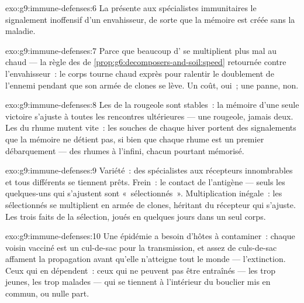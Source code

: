 \begin{solution}{exo:g9:immune-defenses:6}
La  présente aux spécialistes immunitaires le
signalement inoffensif d'un envahisseur, de sorte que la
mémoire est créée sans la maladie.
\end{solution}

\begin{solution}{exo:g9:immune-defenses:7}
Parce que beaucoup d' se multiplient plus
mal au chaud --- la règle des  de
\cref{prop:g6:decomposers-and-soil:speed} retournée contre
l'envahisseur~: le corps tourne chaud exprès pour ralentir
le doublement de l'ennemi pendant que son armée de clones se
lève. Un coût, oui~; une panne, non.
\end{solution}

\begin{solution}{exo:g9:immune-defenses:8}
Les  de la rougeole sont stables~: la mémoire d'une
seule victoire s'ajuste à toutes les rencontres
ultérieures --- une rougeole, jamais deux. Les  du
rhume mutent vite~: les souches de chaque hiver portent des
signalements que la mémoire ne détient pas, si bien que
chaque rhume est un premier débarquement --- des rhumes à
l'infini, chacun pourtant mémorisé.
\end{solution}

\begin{solution}{exo:g9:immune-defenses:9}
Variété~: des spécialistes aux récepteurs innombrables et
tous différents se tiennent prêts. Frein~: le contact de
l'antigène --- seuls les quelques-uns qui s'ajustent sont
«~sélectionnés~». Multiplication inégale~: les sélectionnés
se multiplient en armée de clones, héritant du récepteur qui
s'ajuste. Les trois faits de la sélection, joués en quelques
jours dans un seul corps.
\end{solution}

\begin{solution}{exo:g9:immune-defenses:10}
Une épidémie a besoin d'hôtes à contaminer~: chaque voisin
vacciné est un cul-de-sac pour la transmission, et assez de
culs-de-sac affament la propagation avant qu'elle n'atteigne
tout le monde --- l'extinction. Ceux qui en dépendent~: ceux
qui ne peuvent pas être entraînés --- les trop jeunes, les
trop malades --- qui se tiennent à l'intérieur du bouclier
mis en commun, ou nulle part.
\end{solution}

